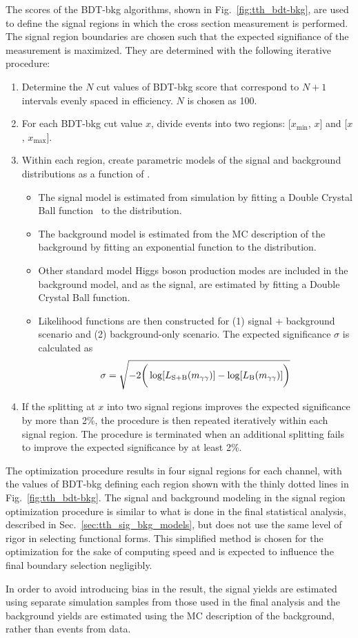The scores of the BDT-bkg algorithms, shown in Fig.~\ref{fig:tth_bdt-bkg}, are used to define the signal regions in which the \ttH cross section measurement is performed.
The signal region boundaries are chosen such that the expected signifiance of the measurement is maximized.
They are determined with the following iterative procedure:
\begin{enumerate}
    \item Determine the $N$ cut values of BDT-bkg score that correspond to $N+1$ intervals evenly spaced in \ttH efficiency. $N$ is chosen as 100.
    \item For each BDT-bkg cut value $x$, divide events into two regions: [$x_{\text{min}}$, $x$] and [$x$, $x_{\text{max}}$].
    \item Within each region, create parametric models of the signal and background distributions as a function of \mgg.
    \begin{itemize}
        \item The \ttH signal model is estimated from simulation by fitting a Double Crystal Ball function~\cite{CrystalBallRef} to the \mgg distribution.
        \item The background model is estimated from the MC description of the background by fitting an exponential function to the \mgg distribution.
        \item Other standard model Higgs boson production modes are included in the background model, and as the signal, are estimated by fitting a Double Crystal Ball function.
        \item Likelihood functions are then constructed for (1) signal + background scenario and (2) background-only scenario. The expected significance $\sigma$ is calculated as
        \begin{equation} \label{eqn:tth_significance}
            \sigma = \sqrt{-2 \bigg(\log[L_{\text{S+B}}(m_{\gamma\gamma})] - \log[L_{\text{B}}(m_{\gamma\gamma})] \bigg)}
        \end{equation} 
    \end{itemize}
    \item If the splitting at $x$ into two signal regions improves the expected significance by more than 2\%, the procedure is then repeated iteratively within each signal region. The procedure is terminated when an additional splitting fails to improve the expected significance by at least 2\%. 
\end{enumerate}
The optimization procedure results in four signal regions for each channel, with the values of BDT-bkg defining each region shown with the thinly dotted lines in Fig.~\ref{fig:tth_bdt-bkg}.
The signal and background modeling in the signal region optimization procedure is similar to what is done in the final statistical analysis, described in Sec.~\ref{sec:tth_sig_bkg_models}, but does not use the same level of rigor in selecting functional forms.
This simplified method is chosen for the optimization for the sake of computing speed and is expected to influence the final boundary selection negligibly.

In order to avoid introducing bias in the result, the \ttH signal yields are estimated using separate simulation samples from those used in the final analysis and the background yields are estimated using the MC description of the background, rather than events from data.
